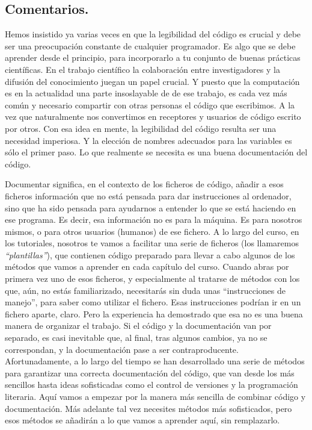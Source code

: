\documentclass[10pt,a4paper]{article}\usepackage[]{graphicx}\usepackage[]{color}
\newcounter {cont01}
\begin{document}
\subsection{Comentarios. }
\label{tut02:subsec:comentarios}

Hemos insistido ya varias veces en que la legibilidad del código es crucial y debe ser una preocupación constante de cualquier programador. Es algo que se debe aprender desde el principio, para incorporarlo a tu conjunto de buenas prácticas científicas.  En el trabajo científico la colaboración entre investigadores y la difusión del conocimiento juegan un papel crucial. Y puesto que la computación es en la actualidad una parte insoslayable de de ese trabajo, es cada vez más común y necesario compartir con otras personas el código que escribimos. A la vez que naturalmente nos convertimos en receptores y usuarios de código escrito por otros.  Con esa idea en mente, la legibilidad del código resulta ser una necesidad imperiosa. Y la elección de nombres adecuados para las variables es sólo el primer paso. Lo que realmente se necesita es una buena {\sf documentación} del código.

Documentar significa, en el contexto de los ficheros de código, añadir a esos ficheros información que no está pensada para dar instrucciones al ordenador, sino que ha sido  pensada para ayudarnos a entender lo que se está haciendo en ese programa. Es decir, esa información no es para la máquina. Es para nosotros mismos, o para otros usuarios (humanos) de ese fichero. A lo largo del curso, en los tutoriales, nosotros te vamos a facilitar una serie de ficheros (los llamaremos {\em ``plantillas''}), que contienen código preparado para llevar a cabo algunos de los métodos que vamos a aprender en cada capítulo del curso. Cuando abras por primera vez uno de esos ficheros, y especialmente al tratarse de métodos con los que, aún, no estás familiarizado, necesitarás sin duda unas ``instrucciones de manejo'', para saber como utilizar el fichero. Esas instrucciones podrían ir en un fichero aparte, claro. Pero la experiencia ha demostrado que esa no es una buena manera de organizar el trabajo. Si el código y la documentación van por separado, es casi inevitable que, al final, tras algunos cambios, ya no se correspondan, y la documentación pase a ser contraproducente.  Afortunadamente, a lo largo del tiempo se han desarrollado una serie de métodos para garantizar una correcta documentación del código, que van desde los más sencillos hasta ideas sofisticadas como el control de versiones y la programación literaria. Aquí vamos a empezar por la manera más sencilla de combinar código y documentación. Más adelante tal vez necesites métodos más sofisticados, pero esos métodos se añadirán a lo que vamos a aprender aquí, sin remplazarlo.
\end{document}
